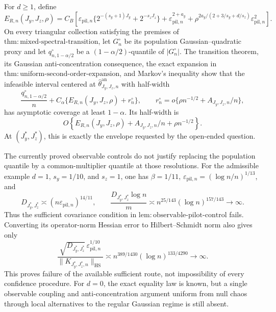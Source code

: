 For \(d\ge1\), define
\[
E_{R,n}(J_y,J_z,\rho)=C_B\left[
\varepsilon_{\mathrm{pil},n}\{2^{-(s_y+1)J_y}+2^{-s_zJ_z}\}
+\varepsilon_{\mathrm{pil},n}^{2+a_y}
+\rho^{2a_y/(2+3/s_y+d/s_z)}\varepsilon_{\mathrm{pil},n}^2
\right].
\]
On every triangular collection satisfying the premises of \(\mathrm{thm{:}mixed\text{-}spectral\text{-}transition}\), let \(G_n^\circ\) be its population Gaussian--quadratic proxy and let \(q_{n,1-\alpha/2}^\circ\) be a \((1-\alpha/2)\)-quantile of \(|G_n^\circ|\). The transition theorem, its Gaussian anti-concentration consequence, the exact expansion in \(\mathrm{thm{:}uniform\text{-}second\text{-}order\text{-}expansion}\), and Markov's inequality show that the infeasible interval centered at \(\widehat\theta^{\mathrm{an}}_{J_y,J_z,n}\) with half-width
\[
\frac{q_{n,1-\alpha/2}^\circ}{n}
+C_\alpha\{E_{R,n}(J_y,J_z,\rho)+r_n^\circ\},
\qquad
r_n^\circ=o\{\rho n^{-1/2}+A_{J_y,J_z,n}/n\},
\]
has asymptotic coverage at least \(1-\alpha\). Its half-width is
\[
O\!\left\{E_{R,n}(J_y,J_z,\rho)+A_{J_y,J_z,n}/n+\rho n^{-1/2}\right\}.
\]
At \((J_y^*,J_z^*)\), this is exactly the envelope requested by the open-ended question.

The currently proved observable controls do not justify replacing the population quantile by a common-multiplier quantile at those resolutions. For the admissible example \(d=1\), \(s_y=1/10\), and \(s_z=1\), one has \(\beta=1/11\), \(\varepsilon_{\mathrm{pil},n}=(\log n/n)^{1/13}\), and
\[
D_{J_y^*,J_z^*}\asymp(n\varepsilon_{\mathrm{pil},n})^{14/11},
\qquad
\frac{D_{J_y^*,J_z^*}\log n}{m}
\asymp n^{25/143}(\log n)^{157/143}\longrightarrow\infty.
\]
Thus the sufficient covariance condition in \(\mathrm{lem{:}observable\text{-}pilot\text{-}control}\) fails. Converting its operator-norm Hessian error to Hilbert--Schmidt norm also gives only
\[
\frac{\sqrt{D_{J_y^*,J_z^*}}\,\varepsilon_{\mathrm{pil},n}^{1/10}}
{\|K_{J_y^*,J_z^*,n}\|_{\mathrm{HS}}}
\asymp n^{389/1430}(\log n)^{133/4290}\longrightarrow\infty.
\]
This proves failure of the available sufficient route, not impossibility of every confidence procedure. For \(d=0\), the exact equality law is known, but a single observable coupling and anti-concentration argument uniform from null chaos through local alternatives to the regular Gaussian regime is still absent.